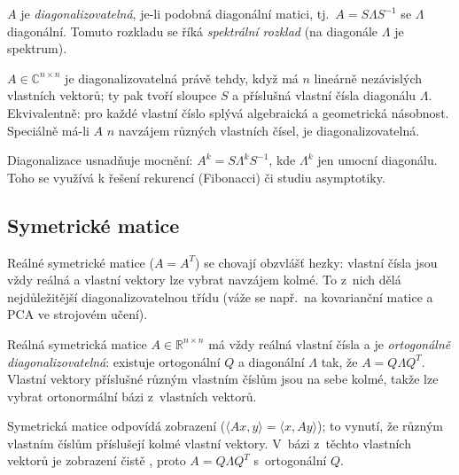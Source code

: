 \documentclass[11pt,a4paper]{article}
\begin{document}
\begin{definice}
$A$ je \emph{diagonalizovatelná}, je-li podobná diagonální matici, tj.\ $A=S\Lambda S^{-1}$ se $\Lambda$ diagonální. Tomuto rozkladu se říká \emph{spektrální rozklad} (na diagonále $\Lambda$ je spektrum).
\end{definice}

\begin{veta}
$A\in\mathbb{C}^{n\times n}$ je diagonalizovatelná právě tehdy, když má $n$ lineárně nezávislých vlastních vektorů; ty pak tvoří sloupce $S$ a příslušná vlastní čísla diagonálu $\Lambda$. Ekvivalentně: pro každé vlastní číslo splývá algebraická a geometrická násobnost. Speciálně má-li $A$ $n$ navzájem různých vlastních čísel, je diagonalizovatelná.
\end{veta}

\begin{poznamka}
Diagonalizace usnadňuje mocnění: $A^k=S\Lambda^kS^{-1}$, kde $\Lambda^k$ jen umocní diagonálu. Toho se využívá k řešení rekurencí (Fibonacci) či studiu asymptotiky.
\end{poznamka}

\subsection{Symetrické matice}

Reálné symetrické matice ($A=A^T$) se chovají obzvlášť hezky: vlastní čísla jsou vždy reálná a vlastní vektory lze vybrat navzájem kolmé. To z~nich dělá nejdůležitější diagonalizovatelnou třídu (váže se např.\ na kovarianční matice a PCA ve strojovém učení).

\begin{veta}
Reálná symetrická matice $A\in\mathbb{R}^{n\times n}$ má vždy reálná vlastní čísla a je \emph{ortogonálně diagonalizovatelná}: existuje ortogonální $Q$ a diagonální $\Lambda$ tak, že $A=Q\Lambda Q^T$. Vlastní vektory příslušné různým vlastním číslům jsou na sebe kolmé, takže lze vybrat ortonormální bázi z~vlastních vektorů.
\end{veta}

\begin{intuice}
Symetrická matice odpovídá  zobrazení ($\langle Ax,y\rangle=\langle x,Ay\rangle$); to vynutí, že různým vlastním číslům příslušejí kolmé vlastní vektory. V~bázi z~těchto vlastních vektorů je zobrazení čistě , proto $A=Q\Lambda Q^T$ s~ortogonální $Q$.
\end{intuice}
\end{document}
